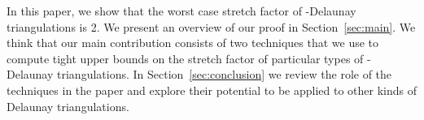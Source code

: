 In this paper, we show that the worst case stretch factor of
{\Large\varhexagon}-Delaunay triangulations is 2. We present an overview of
our proof in Section~\ref{sec:main}. 
\iftoggle{abstract} 
{The overview makes use of three lemmas 
whose detailed proofs are ommitted; the proofs (briefly discussed in 
Sections~\ref{sec:gentle}, \ref{sec:proofA}, and  \ref{sec:proofB}) are
in the full version of the paper (Appendix).}
{The overview makes use of three
lemmas whose detailed proofs are in Sections~\ref{sec:gentle}, \ref{sec:proofA}, and  \ref{sec:proofB}.} 
We think that our main
contribution consists of two techniques that we use to compute tight upper 
bounds  on the stretch factor of particular types of
{\Large\varhexagon}-Delaunay triangulations. In Section~\ref{sec:conclusion}
we review the role of the techniques in the paper and explore their potential
to be applied to other kinds of Delaunay triangulations.

